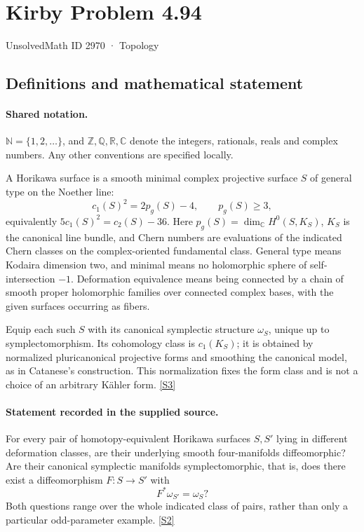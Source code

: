 \documentclass[11pt]{article}
\newcommand{\sref}[2]{\hyperlink{source:#1:#2}{[S#2]}}
\begin{document}
\setcounter{section}{2969}
\section{Kirby Problem 4.94}\label{2970}
{\small\sffamily UnsolvedMath ID 2970 · Topology}
\subsection{Definitions and mathematical statement}

\paragraph{Shared notation.}$\mathbb N=\{1,2,\ldots\}$, and $\mathbb Z,\mathbb Q,\mathbb R,\mathbb C$ denote the integers, rationals, reals and complex numbers. Any other conventions are specified locally.


A Horikawa surface is a smooth minimal complex projective surface $S$ of general type on the Noether line:
\[
c_1(S)^2=2p_g(S)-4,\qquad p_g(S)\ge3,
\]
equivalently $5c_1(S)^2=c_2(S)-36$. Here $p_g(S)=\dim_{\mathbb C}H^0(S,K_S)$, $K_S$ is the canonical line bundle, and Chern numbers are evaluations of the indicated Chern classes on the complex-oriented fundamental class. General type means Kodaira dimension two, and minimal means no holomorphic sphere of self-intersection $-1$. Deformation equivalence means being connected by a chain of smooth proper holomorphic families over connected complex bases, with the given surfaces occurring as fibers.

Equip each such $S$ with its canonical symplectic structure $\omega_S$, unique up to symplectomorphism. Its cohomology class is $c_1(K_S)$; it is obtained by normalized pluricanonical projective forms and smoothing the canonical model, as in Catanese's construction. This normalization fixes the form class and is not a choice of an arbitrary Kähler form. \sref{2970}{3}
\paragraph{Statement recorded in the supplied source.}
For every pair of homotopy-equivalent Horikawa surfaces $S,S'$ lying in different deformation classes, are their underlying smooth four-manifolds diffeomorphic? Are their canonical symplectic manifolds symplectomorphic, that is, does there exist a diffeomorphism $F:S\to S'$ with
\[
F^*\omega_{S'}=\omega_S?
\]
Both questions range over the whole indicated class of pairs, rather than only a particular odd-parameter example. \sref{2970}{2}
\end{document}
